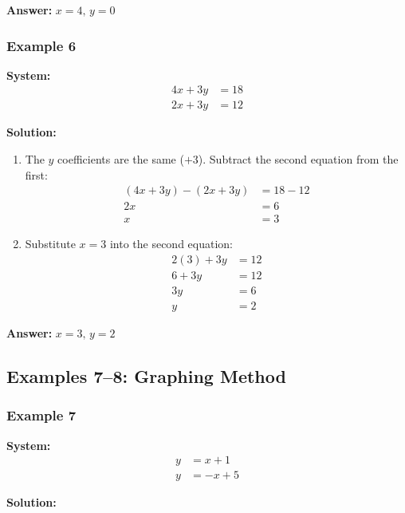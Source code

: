 \documentclass{article}
\begin{document}
\textbf{Answer:} $x = 4, \, y = 0$ \,  

\subsubsection{Example 6}

\textbf{System:}
\begin{align*}
4x + 3y &= 18 \\
2x + 3y &= 12
\end{align*}

\textbf{Solution:}

\begin{enumerate}
    \item The $y$ coefficients are the same ($+3$). Subtract the second equation from the first:
    \begin{align*}
        (4x + 3y) - (2x + 3y) &= 18 - 12 \\
        2x &= 6 \\
        x &= 3
    \end{align*}
    \item Substitute $x = 3$ into the second equation:
    \begin{align*}
        2(3) + 3y &= 12 \\
        6 + 3y &= 12 \\
        3y &= 6 \\
        y &= 2
    \end{align*}
\end{enumerate}

\textbf{Answer:} $x = 3, \, y = 2$ \,  

\subsection{Examples 7--8: Graphing Method}

\subsubsection{Example 7}

\textbf{System:}
\begin{align*}
y &= x + 1 \\
y &= -x + 5
\end{align*}

\textbf{Solution:}
\end{document}
